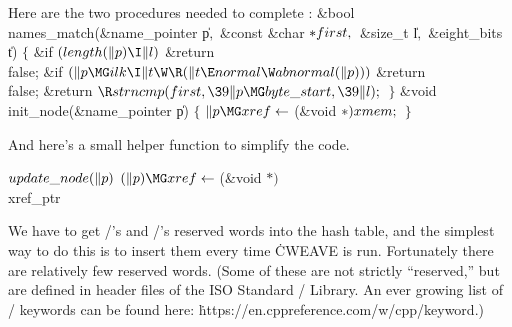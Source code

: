 Here are the two procedures needed to complete :
\Y\B\1\1\&{bool} \\{names\_match}(\&{name\_pointer} \|p${},{}$\6
\&{const} \&{char} ${}{*}\\{first},{}$\6
\&{size\_t} \|l${},{}$\6
\&{eight\_bits} \|t)\2\2\6
${}\{{}$\1\6
\&{if} ${}(\\{length}(\|p)\I\|l){}$\1\5
\&{return} \\{false};\2\6
\&{if} ${}(\|p\MG\\{ilk}\I\|t\W\R(\|t\E\\{normal}\W\\{abnormal}(\|p))){}$\1\5
\&{return} \\{false};\2\6
\&{return} ${}\R\\{strncmp}(\\{first},\39\|p\MG\\{byte\_start},\39\|l);{}$\6
\4${}\}{}$\2\7
\1\1\&{void} \\{init\_node}(\&{name\_pointer} \|p)\2\2\6
${}\{{}$\1\6
${}\|p\MG\\{xref}\K{}$(\&{void} ${}{*})\,\\{xmem};{}$\6
\4${}\}{}$\2\par
\fi

And here's a small helper function to simplify the code.

\Y\B\4\D$\\{update\_node}(\|p)$ \5
$(\|p)\MG\\{xref}\K{}$(\&{void} ${}{*})\,{}$\\{xref\_ptr}\par
\fi

We have to get \CEE/'s and \CPLUSPLUS/'s
reserved words into the hash table, and the simplest way to do this is
to insert them every time \.{CWEAVE} is run.  Fortunately there are relatively
few reserved words. (Some of these are not strictly ``reserved,'' but
are defined in header files of the ISO Standard \CEE/ Library.
An ever growing list of \CPLUSPLUS/ keywords can be found here:
\.{https://en.cppreference.com/w/cpp/keyword}.)

